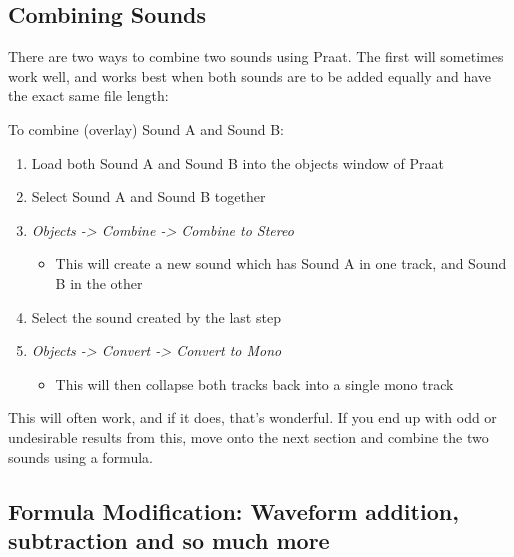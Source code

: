 \hypertarget{combining-sounds}{%
\subsection{Combining Sounds}\label{combining-sounds}}

There are two ways to combine two sounds using Praat. The first will
sometimes work well, and works best when both sounds are to be added
equally and have the exact same file length:

To combine (overlay) Sound A and Sound B:

\begin{enumerate}
\def\labelenumi{\arabic{enumi}.}
\tightlist
\item
  Load both Sound A and Sound B into the objects window of Praat
\item
  Select Sound A and Sound B together
\item
  \emph{Objects -\textgreater{} Combine -\textgreater{} Combine to
  Stereo}

  \begin{itemize}
  \tightlist
  \item
    This will create a new sound which has Sound A in one track, and
    Sound B in the other
  \end{itemize}
\item
  Select the sound created by the last step
\item
  \emph{Objects -\textgreater{} Convert -\textgreater{} Convert to Mono}

  \begin{itemize}
  \tightlist
  \item
    This will then collapse both tracks back into a single mono track
  \end{itemize}
\end{enumerate}

This will often work, and if it does, that's wonderful. If you end up
with odd or undesirable results from this, move onto the next section
and combine the two sounds using a formula.

\hypertarget{formula-modification-waveform-addition-subtraction-and-so-much-more}{%
\subsection{Formula Modification: Waveform addition, subtraction and so
much
more}\label{formula-modification-waveform-addition-subtraction-and-so-much-more}}

\label{sub:formulas}

